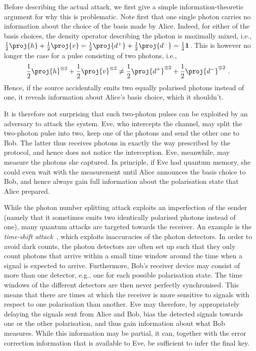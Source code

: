 Before describing the actual attack, we first give a simple information-theoretic argument for why this is problematic. Note first that one single photon carries no information about the choice of the basis made by Alice. Indeed, for either of the basis choices, the density operator describing the photon is maximally mixed, i.e., $\frac{1}{2} \proj{h} + \frac{1}{2} \proj{v} = \frac{1}{2} \proj{d^+} + \frac{1}{2} \proj{d^-} =  \frac{1}{2} \mathbf{1}$. This is however no longer the case for a pulse consisting of two photons, i.e., 
\begin{align}
  \frac{1}{2} \proj{h}^{\otimes 2} + \frac{1}{2} \proj{v}^{\otimes 2} \neq \frac{1}{2} \proj{d^+}^{\otimes 2} + \frac{1}{2} \proj{d^-}^{\otimes 2} \ .
\end{align}
Hence, if the source accidentally emits two equally polarised photons instead of one, it reveals information about Alice's basis choice, which it shouldn't. 

It is therefore not surprising that such two-photon pulses can be exploited by an adversary to attack the system. Eve, who intercepts the channel, may split the two-photon pulse into two, keep one of the photons and send the other one to Bob. The latter thus receives photons in exactly the way prescribed by the protocol, and hence does not notice the interception. Eve, meanwhile, may measure the photons she captured. In principle, if Eve had quantum memory, she could even wait with the measurement until Alice announces the basis choice to Bob, and hence always gain full information about the polarisation state that Alice prepared. 

While the photon number splitting attack exploits an imperfection of the sender (namely that it sometimes emits two identically polarised photons instead of one), many quantum attacks are targeted towards the receiver. An example is the \emph{time-shift attack}~\cite{Makarovetal2006,qi2007time,Zhaoetal2008}, which exploits inaccuracies of the photon detectors. In order to avoid dark counts, the photon detectors are often set up such that they only count photons that arrive within a small time window around the time when a signal is expected to arrive. Furthermore, Bob's receiver device may consist of more than one detector, e.g., one for each possible polarisation state. The time windows of the different detectors are then never perfectly synchronised. This means that there are times at which the receiver is more sensitive to signals with respect to one polarisation than another. Eve may therefore, by appropriately delaying the signals sent from Alice and Bob, bias the detected signals towards one or the other polarisation, and thus gain information about what Bob measures. While this information may be partial, it can, together with the error correction information that is available to Eve, be sufficient to infer the final key. 

